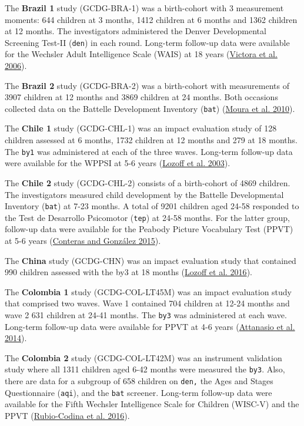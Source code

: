 \documentclass[
]{book}
\begin{document}
The \textbf{Brazil 1} study (GCDG-BRA-1) was a birth-cohort with 3 measurement moments: 644 children at 3 months, 1412 children at 6 months and 1362 children at 12 months. The investigators administered the Denver Developmental Screening Test-II (\texttt{den}) in each round. Long-term follow-up data were available for the Wechsler Adult Intelligence Scale (WAIS) at 18 years (\protect\hyperlink{ref-Victora2006}{Victora et al. 2006}).

The \textbf{Brazil 2} study (GCDG-BRA-2) was a birth-cohort with measurements of 3907 children at 12 months and 3869 children at 24 months. Both occasions collected data on the Battelle Development Inventory (\texttt{bat}) (\protect\hyperlink{ref-Moura2010}{Moura et al. 2010}).

The \textbf{Chile 1} study (GCDG-CHL-1) was an impact evaluation study of 128 children assessed at 6 months, 1732 children at 12 months and 279 at 18 months. The \texttt{by1} was administered at each of the three waves. Long-term follow-up data were available for the WPPSI at 5-6 years (\protect\hyperlink{ref-Lozoff2003}{Lozoff et al. 2003}).

The \textbf{Chile 2} study (GCDG-CHL-2) consists of a birth-cohort of 4869 children. The investigators measured child development by the Battelle Developmental Inventory (\texttt{bat}) at 7-23 months. A total of 9201 children aged 24-58 responded to the Test de Desarrollo Psicomotor (\texttt{tep}) at 24-58 months. For the latter group, follow-up data were available for the Peabody Picture Vocabulary Test (PPVT) at 5-6 years (\protect\hyperlink{ref-conteras2015}{Conteras and González 2015}).

The \textbf{China} study (GCDG-CHN) was an impact evaluation study that contained 990 children assessed with the by3 at 18 months (\protect\hyperlink{ref-Lozoff2016}{Lozoff et al. 2016}).

The \textbf{Colombia 1} study (GCDG-COL-LT45M) was an impact evaluation study that comprised two waves. Wave 1 contained 704 children at 12-24 months and wave 2 631 children at 24-41 months. The \texttt{by3} was administered at each wave. Long-term follow-up data were available for PPVT at 4-6 years (\protect\hyperlink{ref-Attanasio2014}{Attanasio et al. 2014}).

The \textbf{Colombia 2} study (GCDG-COL-LT42M) was an instrument validation study where all 1311 children aged 6-42 months were measured the \texttt{by3}. Also, there are data for a subgroup of 658 children on \texttt{den,} the Ages and Stages Questionnaire (\texttt{aqi}), and the \texttt{bat} screener. Long-term follow-up data were available for the Fifth Wechsler Intelligence Scale for Children (WISC-V) and the PPVT (\protect\hyperlink{ref-Rubio-Codina2016}{Rubio-Codina et al. 2016}).
\end{document}
